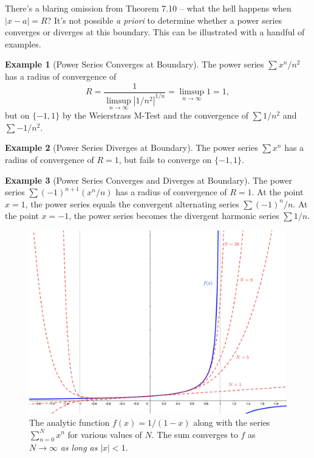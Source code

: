 \documentclass{article}
\theoremstyle{definition}
\newtheorem{example}{Example}[section]
\begin{document}
	There's a blaring omission from Theorem 7.10 -- what the hell happens when $ |x-a|=R $? It's not possible \textit{a priori} to determine whether a power series converges or diverges at this boundary. This can be illustrated with a handful of examples.
	
	\begin{example}[Power Series Converges at Boundary]
		The power series $ \sum x^n/n^2$ has a radius of convergence of $$ R = \dfrac{1}{\limsup\limits_{n\to\infty}|1/n^2|^{1/n}} = {\limsup\limits_{n\to\infty}1}= 1, $$ but on $ \{-1,1\} $ by the Weierstrass M-Test and the convergence of $ \sum1/n^2 $ and $ \sum-1/n^2 $.
	\end{example}
	\begin{example}[Power Series Diverges at Boundary]
		The power series $ \sum x^n $ has a radius of convergence of $ R = 1 $, but fails to converge on $ \{-1,1\} $. 
	\end{example}
	\begin{example}[Power Series Converges and Diverges at Boundary]
		The power series $ \sum(-1)^{n+1}(x^n/n) $ has a radius of convergence of $ R = 1 $. At the point $ x = 1 $, the power series equals the convergent alternating series $ \sum (-1)^n/n$. At the point $ x = -1 $, the power series becomes the divergent harmonic series $ \sum 1/n $.
	\end{example}
	\begin{figure}
		\centering
		\includegraphics[width=0.9\linewidth]{figures/power_series}
		\caption{The analytic function $ f(x)=1/(1-x) $ along with the series $ \sum_{n=0}^{N}x^n $ for various values of $ N $. The sum converges to $ f $ as $ N\to\infty $ \textit{as long as} $ |x|<1 $.}
		\label{fig:powerseries}
	\end{figure}
	
\end{document}
